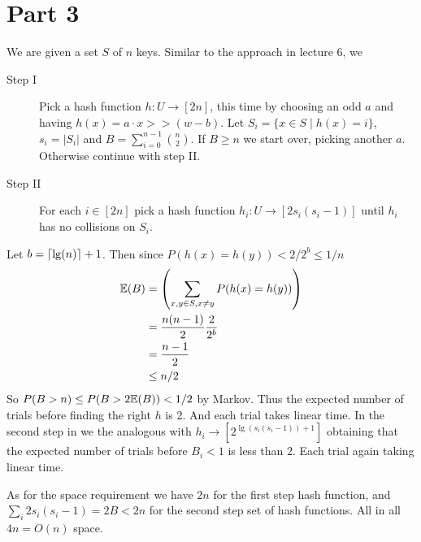 \section*{Part 3}
We are given a set $S$ of $n$ keys.
Similar to the approach in lecture 6, we 
\begin{description}
  \item[Step I] Pick a hash function $h:U \to [2n]$,
    this time by choosing an odd $a$
    and having $h(x) = a \cdot x >> (w - b)$.
    Let $S_i = \{ x \in S \mid h(x) = i \}$,
    $s_i = |S_i|$
    and $B = \sum_{i=0}^{n-1} \binom{n}{2}$.
    If $B \geq n$ we start over,
    picking another $a$.
    Otherwise continue with step II.
  \item[Step II]
    For each $i \in [2n]$
    pick a hash function $h_i:U \to [2 s_i (s_i - 1)]$
    until $h_i$ has no collisions on $S_i$.
\end{description}
Let $b = \lceil\lg(n)\rceil + 1$.
Then since $P(h(x) = h(y)) < 2/2^b \leq 1/n$
\begin{align*}
  \mathbb{E}(B) &= \left( \sum_{x,y \in S, x \neq y} P(h(x) = h(y)) \right)
  \\ &= \frac{n(n-1)}{2} \frac{2}{2^b}
  \\ &= \frac{n-1}{2}
  \\ &\leq n/2
\end{align*}
So $P(B > n) \leq P(B > 2 \mathbb{E}(B)) < 1/2 $ by Markov.
Thus the expected number of trials before finding the right $h$ is 2.
And each trial takes linear time.
In the second step in we the analogous with
$h_i \to [2^{\lg(s_i(s_i - 1)) + 1}]$
obtaining that the expected number of trials before $B_i < 1$ is less than 2.
Each trial again taking linear time.

As for the space requirement we have $2n$ for the first step hash function,
and $\sum_{i} 2 s_i (s_i - 1) = 2 B < 2n$ for the second step set of hash functions.
All in all $4n = O(n)$ space.
